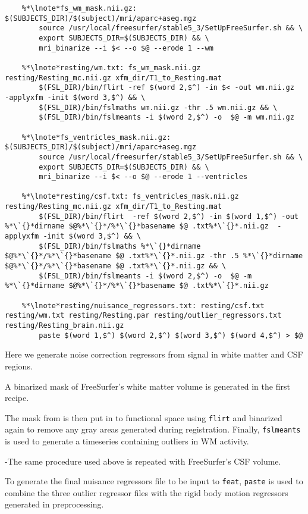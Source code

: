 \begin{lstlisting}
	%*\lnote*fs_wm_mask.nii.gz: $(SUBJECTS_DIR)/$(subject)/mri/aparc+aseg.mgz
		source /usr/local/freesurfer/stable5_3/SetUpFreeSurfer.sh && \
		export SUBJECTS_DIR=$(SUBJECTS_DIR) && \
		mri_binarize --i $< --o $@ --erode 1 --wm
	
	%*\lnote*resting/wm.txt: fs_wm_mask.nii.gz resting/Resting_mc.nii.gz xfm_dir/T1_to_Resting.mat
		$(FSL_DIR)/bin/flirt -ref $(word 2,$^) -in $< -out wm.nii.gz  -applyxfm -init $(word 3,$^) && \
		$(FSL_DIR)/bin/fslmaths wm.nii.gz -thr .5 wm.nii.gz && \
		$(FSL_DIR)/bin/fslmeants -i $(word 2,$^) -o  $@ -m wm.nii.gz
	
	%*\lnote*fs_ventricles_mask.nii.gz: $(SUBJECTS_DIR)/$(subject)/mri/aparc+aseg.mgz
		source /usr/local/freesurfer/stable5_3/SetUpFreeSurfer.sh && \
		export SUBJECTS_DIR=$(SUBJECTS_DIR) && \
		mri_binarize --i $< --o $@ --erode 1 --ventricles
	
	%*\lnote*resting/csf.txt: fs_ventricles_mask.nii.gz resting/Resting_mc.nii.gz xfm_dir/T1_to_Resting.mat
		$(FSL_DIR)/bin/flirt  -ref $(word 2,$^) -in $(word 1,$^) -out %*\`{}*dirname $@%*\`{}*/%*\`{}*basename $@ .txt%*\`{}*.nii.gz  -applyxfm -init $(word 3,$^) && \
		$(FSL_DIR)/bin/fslmaths %*\`{}*dirname $@%*\`{}*/%*\`{}*basename $@ .txt%*\`{}*.nii.gz -thr .5 %*\`{}*dirname $@%*\`{}*/%*\`{}*basename $@ .txt%*\`{}*.nii.gz && \
		$(FSL_DIR)/bin/fslmeants -i $(word 2,$^) -o  $@ -m %*\`{}*dirname $@%*\`{}*/%*\`{}*basename $@ .txt%*\`{}*.nii.gz
	
	%*\lnote*resting/nuisance_regressors.txt: resting/csf.txt resting/wm.txt resting/Resting.par resting/outlier_regressors.txt resting/Resting_brain.nii.gz
		paste $(word 1,$^) $(word 2,$^) $(word 3,$^) $(word 4,$^) > $@
\end{lstlisting}
Here we generate noise correction regressors from signal in white matter and CSF regions. 

A binarized mask of FreeSurfer's white matter volume is generated in the first recipe. 

\lnum{32}The mask from \lnum{31}is then put in to functional space using \texttt{flirt} and binarized again to remove any gray areas generated during registration. Finally, \texttt{fslmeants} is used to generate a timeseries containing outliers in WM activity. 

\lnum{33}-\lnum{34}The same procedure used above is repeated with FreeSurfer's CSF volume.

\lnum{35}To generate the final nuisance regressors file to be input to \texttt{feat}, \texttt{paste} is used to combine the three outlier regressor files with the rigid body motion regressors generated in preprocessing.
\\

